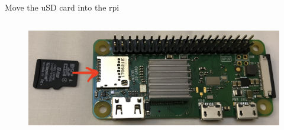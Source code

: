 \begin{frame}
   {Move the uSD card into the rpi}
   \begin{figure}[H]
      \centering
      \includegraphics[height=2in]{IMAGES/rpi0whsd-sd-in}
   \end{figure}
\end{frame}

\cprotect\note{


}


